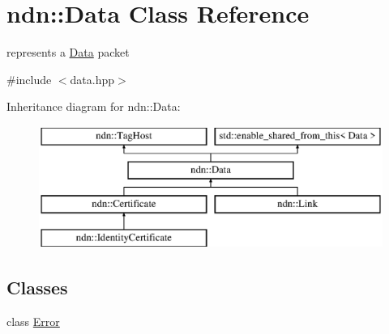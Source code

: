 \hypertarget{classndn_1_1Data}{}\section{ndn\+:\+:Data Class Reference}
\label{classndn_1_1Data}


represents a \hyperlink{classndn_1_1Data}{Data} packet  




{\ttfamily \#include $<$data.\+hpp$>$}

Inheritance diagram for ndn\+:\+:Data\+:\begin{figure}[H]
\begin{center}
\leavevmode
\includegraphics[height=4.000000cm]{classndn_1_1Data}
\end{center}
\end{figure}
\subsection*{Classes}
\begin{DoxyCompactItemize}
\item 
class \hyperlink{classndn_1_1Data_1_1Error}{Error}
\end{DoxyCompactItemize}
